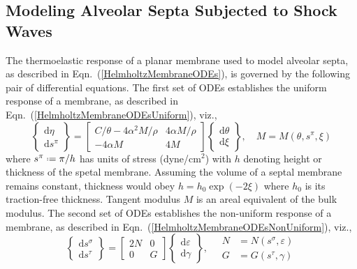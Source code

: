 \subsection{Modeling Alveolar Septa Subjected to Shock Waves}
\label{secConjugatePairs}

The thermo\-elastic response of a planar membrane used to model alveolar septa, as described in Eqn.~(\ref{HelmholtzMembraneODEs}), is governed by the following pair of differential equations.  The first set of ODEs establishes the uniform response of a membrane, as described in Eqn.~(\ref{HelmholtzMembraneODEsUniform}), viz.,
\begin{displaymath}
    \left\{ \begin{matrix}
    \mathrm{d} \eta \\ \mathrm{d} s^{\pi}
    \end{matrix} \right\} = \begin{bmatrix}
    C / \theta - 4 \alpha^2 M / \rho & 
    4 \alpha M / \rho \\
    -4 \alpha M & 4 M
    \end{bmatrix} \left\{ \begin{matrix}
    \mathrm{d} \theta \\ \mathrm{d} \xi
    \end{matrix} \right\} , \quad
    M = M ( \theta , s^{\pi} , \xi )
\end{displaymath}
where $s^{\pi} \defeq \pi / h$ has units of stress (dyne/$\text{cm}^2$) with $h$ denoting height or thickness of the spetal membrane.  Assuming the volume of a septal membrane remains constant, thickness would obey $h = h_0 \exp ( -2 \xi )$ where $h_0$ is its traction-free thickness.  Tangent modulus $M$ is an areal equivalent of the bulk modulus.  The second set of ODEs establishes the non-uniform response of a membrane, as described in Eqn.~(\ref{HelmholtzMembraneODEsNonUniform}), viz.,
\begin{displaymath}
    \left\{ \begin{matrix}
    \mathrm{d} s^{\sigma} \\ \mathrm{d} s^{\tau}
    \end{matrix} \right\} = \begin{bmatrix}
    2N & 0 \\
    0 & G
    \end{bmatrix} \left\{ \begin{matrix}
    \mathrm{d} \varepsilon \\ \mathrm{d} \gamma
    \end{matrix} \right\} , \quad
    \begin{aligned}
        N & = N ( s^{\sigma} , \varepsilon ) \\
        G & = G ( s^{\tau} , \gamma )
    \end{aligned}
\end{displaymath}
